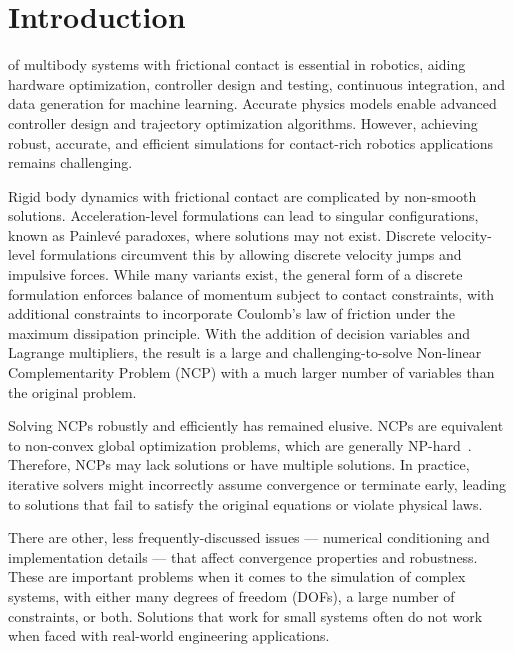 \section{Introduction}

 of multibody systems with frictional contact is
essential in robotics, aiding hardware optimization, controller design and
testing, continuous integration, and data generation for machine learning.
Accurate physics models enable advanced controller design and trajectory
optimization algorithms. However, achieving robust, accurate, and efficient
simulations for contact-rich robotics applications remains challenging.

Rigid body dynamics with frictional contact are complicated by non-smooth
solutions. Acceleration-level formulations can lead to singular configurations,
known as Painlev\'e paradoxes, where solutions may not exist. Discrete
velocity-level formulations circumvent this by allowing discrete velocity jumps and
impulsive forces. While many variants exist, the general form of a discrete
formulation enforces balance of momentum subject to contact constraints,
with additional constraints to incorporate Coulomb's law of friction under the
maximum dissipation principle. With the addition of decision
variables and Lagrange multipliers, the result is a large and challenging-to-solve
Non-linear Complementarity Problem (NCP) with a much larger number of
variables than the original problem.

Solving NCPs robustly and efficiently has remained elusive. NCPs are equivalent
to non-convex global optimization problems, which are generally
NP-hard~\cite{bib:Kaufman2008}. Therefore, NCPs may lack solutions or have
multiple solutions. In practice, iterative solvers might incorrectly assume
convergence or terminate early, leading to solutions that fail to satisfy the
original equations or violate physical laws.

There are other, less frequently-discussed issues --- numerical conditioning
and implementation details --- that affect convergence properties and robustness. These
are important problems when it comes to the simulation of complex systems, with
either many degrees of freedom (DOFs), a large number of constraints,
or both. Solutions that work for small systems often do not work when faced
with real-world engineering applications.


